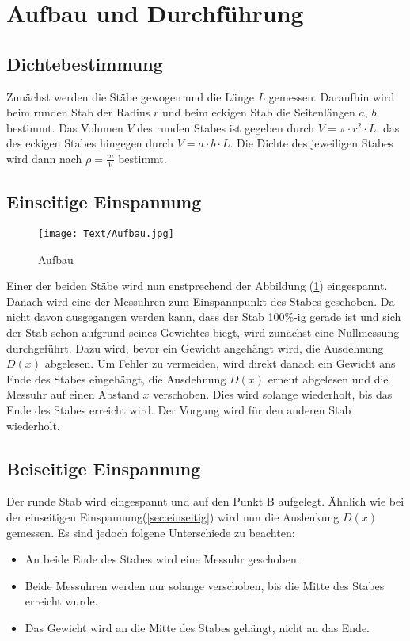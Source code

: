 \section{Aufbau und Durchführung \cite{sample}}

\subsection{Dichtebestimmung \label{sec:dichte}}
Zunächst werden die Stäbe gewogen und die Länge $L$ gemessen.
Daraufhin wird beim runden Stab der Radius $r$ und beim eckigen Stab die Seitenlängen $a$, $b$ bestimmt.
Das Volumen $V$ des runden Stabes ist gegeben durch $V=\pi \cdot r^2 \cdot L$,
das des eckigen Stabes hingegen durch $V=a \cdot b \cdot L$.
Die Dichte des jeweiligen Stabes wird dann nach $\rho = \frac{m}{V}$ bestimmt.
\subsection{Einseitige Einspannung \label{sec:einseitig}}
\begin{figure}
  \centering
  \texttt{[image: Text/Aufbau.jpg]}
  \caption{Aufbau \cite[2]{sample}}
  \label{fig:Aufbau}
\end{figure}
Einer der beiden Stäbe wird nun enstprechend der Abbildung (\ref{fig:Aufbau}) eingespannt.
Danach wird eine der Messuhren zum Einspannpunkt des Stabes geschoben.
Da nicht davon ausgegangen werden kann, dass der Stab 100\%-ig gerade ist und
sich der Stab schon aufgrund seines Gewichtes biegt, wird zunächst eine Nullmessung durchgeführt.
Dazu wird, bevor ein Gewicht angehängt wird, die Ausdehnung $D(x)$ abgelesen.
Um Fehler zu vermeiden, wird direkt danach ein Gewicht ans Ende des Stabes eingehängt,
die Ausdehnung $D(x)$ erneut abgelesen und die Messuhr auf einen Abstand $x$ verschoben.
Dies wird solange wiederholt, bis das Ende des Stabes erreicht wird.
Der Vorgang wird für den anderen Stab wiederholt.
\subsection{Beiseitige Einspannung}
Der runde Stab wird eingespannt und auf den Punkt B aufgelegt.
Ähnlich wie bei der einseitigen Einspannung(\ref{sec:einseitig}) wird nun die Auslenkung $D(x)$ gemessen.
Es sind jedoch folgene Unterschiede zu beachten:
\begin{itemize}
\item An beide Ende des Stabes wird eine Messuhr geschoben.
\item Beide Messuhren werden nur solange verschoben, bis die Mitte des Stabes erreicht wurde.
\item Das Gewicht wird an die Mitte des Stabes gehängt, nicht an das Ende.
\end{itemize}
